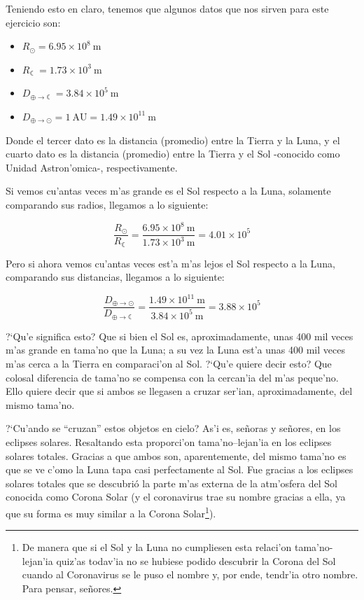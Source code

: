 \documentclass{article}
\begin{document}
\begin{enumerate} [a)]
Teniendo esto en claro, tenemos que algunos datos que nos sirven para este ejercicio son:

\begin{itemize}

\item $R_\odot= 6.95 \times 10^{8} \ \text{m}$

\item $R_{\leftmoon} = 1.73 \times 10^{3} \ \text{m}$

\item $D_{\oplus \rightarrow \leftmoon} = 3.84 \times 10^{5} \ \text{m}$

\item $D_{\oplus \rightarrow \odot} = 1 \ \text{AU} = 1.49 \times 10^{11} \ \text{m}$ 
\end{itemize}

Donde el tercer dato es la distancia (promedio) entre la Tierra y la Luna, y el cuarto dato es la distancia (promedio) entre la Tierra y el Sol -conocido como Unidad Astron'omica-, respectivamente.
\end{enumerate}

Si vemos cu'antas veces m'as grande es el Sol respecto a la Luna, solamente comparando sus radios, llegamos a lo siguiente:

\begin{equation*}
\frac{R_\odot}{R_{\leftmoon}} = \frac{6.95 \times 10^{8} \ \text{m}}{ 1.73 \times 10^{3} \ \text{m}} = 4.01 \times 10^{5}
\end{equation*}

Pero si ahora vemos cu'antas veces est'a m'as lejos el Sol respecto a la Luna, comparando sus distancias, llegamos a lo siguiente:

\begin{equation*}
\frac{D_{\oplus \rightarrow \odot}}{D_{\oplus \rightarrow \leftmoon}} = \frac{1.49 \times 10^{11} \ \text{m}}{3.84 \times 10^{5} \ \text{m}} = 3.88 \times 10^5
\end{equation*}

?`Qu'e significa esto? Que si bien el Sol es, aproximadamente, unas 400 mil veces m'as grande en tama'no que la Luna; a su vez la Luna est'a unas 400 mil veces m'as cerca a la Tierra en comparaci'on al Sol. ?`Qu'e quiere decir esto? Que colosal diferencia de tama'no se compensa con la cercan'ia del m'as peque'no. Ello quiere decir que si ambos se llegasen a cruzar ser'ian, aproximadamente, del mismo tama'no.

?`Cu'ando se ``cruzan'' estos objetos en cielo? As'i es, señoras y señores, en los eclipses solares. Resaltando esta proporci'on tama'no--lejan'ia en los eclipses solares totales. Gracias a que ambos son, aparentemente, del mismo tama'no es que se ve c'omo la Luna tapa casi perfectamente al Sol. Fue gracias a los eclipses solares totales que se descubrió la parte m'as externa de la atm'osfera del Sol conocida como Corona Solar (y el coronavirus trae su nombre gracias a ella, ya que su forma es muy similar a la Corona Solar\footnote{De manera que si el Sol y la Luna no cumpliesen  esta relaci'on tama'no-lejan'ia quiz'as todav'ia no se hubiese podido descubrir la Corona del Sol cuando al Coronavirus se le puso el nombre y, por ende, tendr'ia otro nombre. Para pensar, señores.}). 
\end{document}
